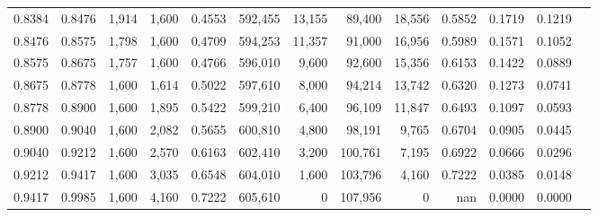 \begin{tabular}{rrrrrrrrrrrrr}
0.8384 & 0.8476 &  1,914 & 1,600 &                                     0.4553 & 592,455 &  13,155 &  89,400 &  18,556 & 0.5852 & 0.1719 & 0.1219 \\
0.8476 & 0.8575 &  1,798 & 1,600 &                                     0.4709 & 594,253 &  11,357 &  91,000 &  16,956 & 0.5989 & 0.1571 & 0.1052 \\
0.8575 & 0.8675 &  1,757 & 1,600 &                                     0.4766 & 596,010 &   9,600 &  92,600 &  15,356 & 0.6153 & 0.1422 & 0.0889 \\
0.8675 & 0.8778 &  1,600 & 1,614 &                                     0.5022 & 597,610 &   8,000 &  94,214 &  13,742 & 0.6320 & 0.1273 & 0.0741 \\
0.8778 & 0.8900 &  1,600 & 1,895 &                                     0.5422 & 599,210 &   6,400 &  96,109 &  11,847 & 0.6493 & 0.1097 & 0.0593 \\
0.8900 & 0.9040 &  1,600 & 2,082 &                                     0.5655 & 600,810 &   4,800 &  98,191 &   9,765 & 0.6704 & 0.0905 & 0.0445 \\
0.9040 & 0.9212 &  1,600 & 2,570 &                                     0.6163 & 602,410 &   3,200 & 100,761 &   7,195 & 0.6922 & 0.0666 & 0.0296 \\
0.9212 & 0.9417 &  1,600 & 3,035 &                                     0.6548 & 604,010 &   1,600 & 103,796 &   4,160 & 0.7222 & 0.0385 & 0.0148 \\
0.9417 & 0.9985 &  1,600 & 4,160 &                                     0.7222 & 605,610 &       0 & 107,956 &       0 &    nan & 0.0000 & 0.0000 \\
\bottomrule
\end{tabular}
